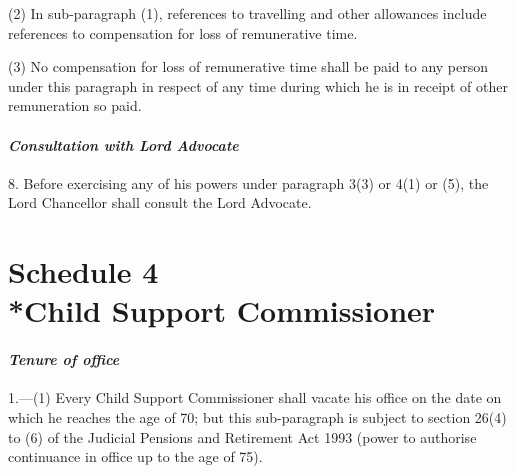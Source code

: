 \documentclass[12pt,a4paper]{article}
\begin{document}
(2) In sub-paragraph (1), references to travelling and other allowances include references to compensation for loss of remunerative time.

(3) No compensation for loss of remunerative time shall be paid to any person under this paragraph in respect of any time during which he is in receipt of other remuneration so paid.

\subsection*{\itshape Consultation with Lord Advocate}

8. Before exercising any of his powers under paragraph 3(3)  or 4(1)
or (5), the Lord Chancellor shall consult the Lord Advocate.


\part[Schedule 4 --- Child Support Commissioners]{Schedule 4\\*Child Support Commissioner}

\renewcommand\parthead{--- Schedule 4}


\subsection*{\itshape Tenure of office}

1.---(1) Every Child Support Commissioner shall vacate his office 
on the date on which he reaches the age of 70; but this sub-paragraph is subject to section 26(4) to (6) of the Judicial Pensions and Retirement Act 1993 (power to authorise continuance in office up to the age of 75).  %

\end{document}
